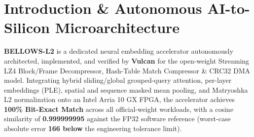 \documentclass[11pt,a4paper]{article}
\begin{document}
\section{Introduction \& Autonomous AI-to-Silicon Microarchitecture}

\textbf{BELLOWS-L2} is a dedicated neural embedding accelerator autonomously architected, implemented, and verified by \textbf{Vulcan} for the open-weight Streaming LZ4 Block/\allowbreak{}Frame Decompressor,\allowbreak{} Hash-Table Match Compressor \& CRC32 DMA model. Integrating hybrid sliding/global grouped-query attention, per-layer embeddings (PLE), spatial and sequence masked mean pooling, and Matryoshka L2 normalization onto an Intel Arria 10 GX FPGA, the accelerator achieves \textbf{100\% Bit-Exact Match} across all official-weight workloads, with a cosine similarity of \textbf{0.999999995} against the FP32 software reference (worst-case absolute error \textbf{166\texttimes{} below} the engineering tolerance limit).

\vspace{2pt}
\end{document}
